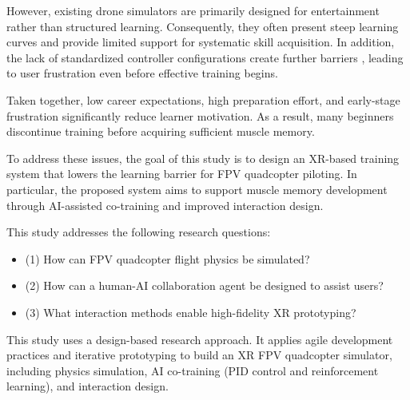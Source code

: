 However, existing drone simulators are primarily designed for entertainment rather than structured learning. Consequently, they often present steep learning curves and provide limited support for systematic skill acquisition. In addition, the lack of standardized controller configurations create further barriers \parencite{ebeid_survey_2018}, leading to user frustration even before effective training begins.

Taken together, low career expectations, high preparation effort, and early-stage frustration significantly reduce learner motivation. As a result, many beginners discontinue training before acquiring sufficient muscle memory.

To address these issues, the goal of this study is to design an XR-based training system that lowers the learning barrier for FPV quadcopter piloting. In particular, the proposed system aims to support muscle memory development through AI-assisted co-training and improved interaction design.

This study addresses the following research questions:

\begin{itemize}
\item[] (1) How can FPV quadcopter flight physics be simulated?
\item[] (2) How can a human-AI collaboration agent be designed to assist users?
\item[] (3) What interaction methods enable high-fidelity XR prototyping?
\end{itemize}

This study uses a design-based research approach. It applies agile development practices and iterative prototyping to build an XR FPV quadcopter simulator, including physics simulation, AI co-training (PID control and reinforcement learning), and interaction design.